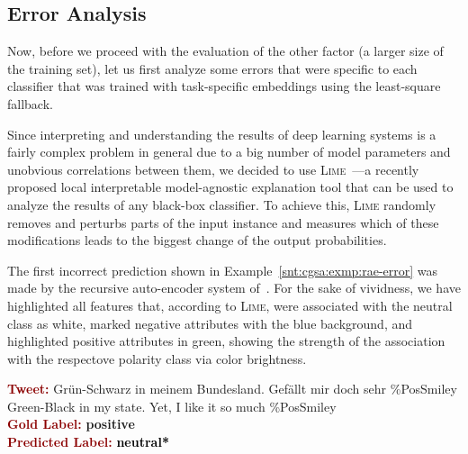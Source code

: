 \subsection{Error Analysis}

Now, before we proceed with the evaluation of the other factor (a
larger size of the training set), let us first analyze some errors
that were specific to each classifier that was trained with
task-specific embeddings using the least-square fallback.

Since interpreting and understanding the results of deep learning
systems is a fairly complex problem in general due to a big number of
model parameters and unobvious correlations between them, we decided
to use \textsc{Lime}~\cite{Ribeiro:16}---a recently proposed local
interpretable model-agnostic explanation tool that can be used to
analyze the results of any black-box classifier.  To achieve this,
\textsc{Lime} randomly removes and perturbs parts of the input
instance and measures which of these modifications leads to the
biggest change of the output probabilities.

The first incorrect prediction shown in
Example~\ref{snt:cgsa:exmp:rae-error} was made by the recursive
auto-encoder system of~\citet{Socher:11}.  For the sake of vividness,
we have highlighted all features that, according to \textsc{Lime},
were associated with the neutral class as white, marked negative
attributes with the \colorbox{blue!30}{blue} background, and
highlighted positive attributes in \colorbox{green!30}{green}, showing
the strength of the association with the respectove polarity class via
color brightness.

\begin{example}\label{snt:cgsa:exmp:rae-error}
  \noindent\textup{\bfseries\textcolor{darkred}{Tweet:}} {\upshape \colorbox{white!5}{Gr\"un}\colorbox{blue!11}{-}\colorbox{white!25.7}{Schwarz} \colorbox{white!5}{in} \colorbox{white!2.5!blue!1}{meinem} Bundesland. \colorbox{green!10}{Gef\"allt} \colorbox{white!5!blue!4.5}{mir} \colorbox{white!5!blue!5}{doch} \colorbox{white!4.6!blue!5}{sehr} \colorbox{white!5!blue!5}{\%PosSmiley}}\\
  \noindent \colorbox{white!5}{Green}\colorbox{blue!11}{-}\colorbox{white!25.7}{Black} \colorbox{white!5}{in} \colorbox{white!2.5!blue!1}{my} state.  \colorbox{white!5!blue!5}{Yet}, \colorbox{white!5!blue!4.5}{I} \colorbox{green!10}{like} it \colorbox{white!4.6!blue!5}{so much} \colorbox{white!5!blue!5}{\%PosSmiley}\\[\exampleSep]
  \noindent\textup{\bfseries\textcolor{darkred}{Gold Label:}}\hspace*{4.3em}\textbf{%
    \upshape\textcolor{green3}{positive}}\\
 \noindent\textup{\bfseries\textcolor{darkred}{Predicted Label:}}\hspace*{2em}\textbf{%
    \upshape\textcolor{black}{neutral*}}
\end{example}

